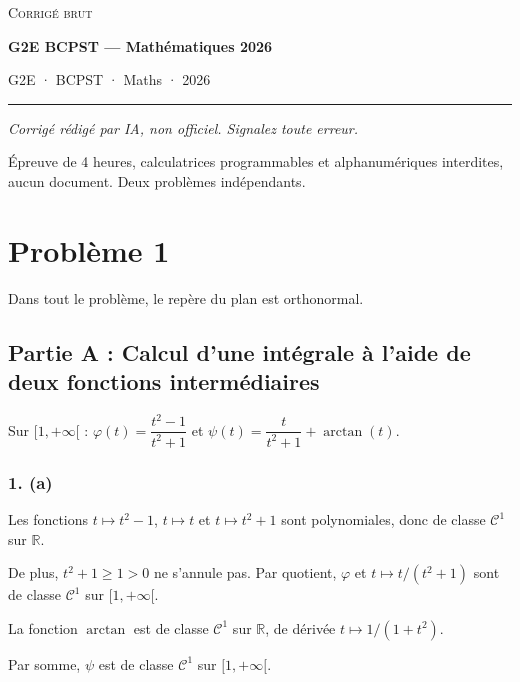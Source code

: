 \documentclass[11pt,a4paper]{article}
\begin{document}
\thispagestyle{plain}
\begin{center}
  {\small\scshape Corrigé brut}\par\smallskip
  {\LARGE\bfseries G2E BCPST — Mathématiques 2026\par}\medskip
  {\large G2E · BCPST · Maths · 2026\par}
\end{center}
\vspace{2pt}\hrule\vspace{8pt}

\emph{Corrigé rédigé par IA, non officiel. Signalez toute erreur.}

Épreuve de 4 heures, calculatrices programmables et alphanumériques interdites, aucun document. Deux problèmes indépendants.

\hypertarget{probluxe8me-1}{%
\section{Problème 1}\label{probluxe8me-1}}

Dans tout le problème, le repère du plan est orthonormal.

\hypertarget{partie-a-calcul-dune-intuxe9grale-uxe0-laide-de-deux-fonctions-intermuxe9diaires}{%
\subsection{Partie A : Calcul d'une intégrale à l'aide de deux fonctions intermédiaires}\label{partie-a-calcul-dune-intuxe9grale-uxe0-laide-de-deux-fonctions-intermuxe9diaires}}

Sur \([1,+\infty[\) : \(\varphi(t)=\dfrac{t^2-1}{t^2+1}\) et \(\psi(t)=\dfrac{t}{t^2+1}+\arctan(t)\).

\hypertarget{a}{%
\subsubsection{1. (a)}\label{a}}

Les fonctions \(t\mapsto t^2-1\), \(t\mapsto t\) et \(t\mapsto t^2+1\) sont polynomiales, donc de classe \(\mathcal C^1\) sur \(\mathbb R\).

De plus, \(t^2+1\geqslant 1>0\) ne s'annule pas. Par quotient, \(\varphi\) et \(t\mapsto t/(t^2+1)\) sont de classe \(\mathcal C^1\) sur \([1,+\infty[\).

La fonction \(\arctan\) est de classe \(\mathcal C^1\) sur \(\mathbb R\), de dérivée \(t\mapsto 1/(1+t^2)\).

Par somme, \(\psi\) est de classe \(\mathcal C^1\) sur \([1,+\infty[\).
\end{document}
